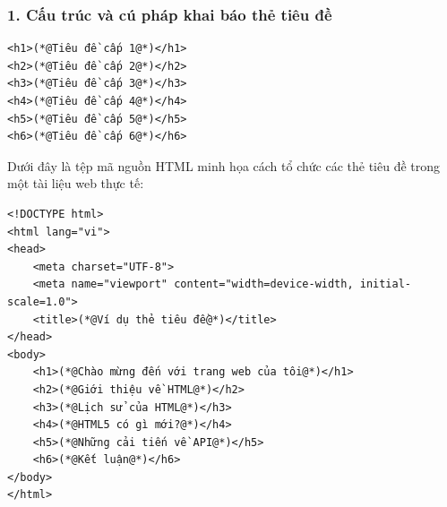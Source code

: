 \subsubsection{1. Cấu trúc và cú pháp khai báo thẻ tiêu đề}

\begin{codeWindow}
\begin{lstlisting}[language=HTML5]
<h1>(*@Tiêu đề cấp 1@*)</h1>
<h2>(*@Tiêu đề cấp 2@*)</h2>
<h3>(*@Tiêu đề cấp 3@*)</h3>
<h4>(*@Tiêu đề cấp 4@*)</h4>
<h5>(*@Tiêu đề cấp 5@*)</h5>
<h6>(*@Tiêu đề cấp 6@*)</h6>
\end{lstlisting}
\end{codeWindow}

Dưới đây là tệp mã nguồn HTML minh họa cách tổ chức các thẻ tiêu đề trong một tài liệu web thực tế:

\begin{codeWindow}
\begin{lstlisting}[language=HTML5]
<!DOCTYPE html>
<html lang="vi">
<head>
    <meta charset="UTF-8">
    <meta name="viewport" content="width=device-width, initial-scale=1.0">
    <title>(*@Ví dụ thẻ tiêu đề@*)</title>
</head>
<body>
    <h1>(*@Chào mừng đến với trang web của tôi@*)</h1>
    <h2>(*@Giới thiệu về HTML@*)</h2>
    <h3>(*@Lịch sử của HTML@*)</h3>
    <h4>(*@HTML5 có gì mới?@*)</h4>
    <h5>(*@Những cải tiến về API@*)</h5>
    <h6>(*@Kết luận@*)</h6>
</body>
</html>
\end{lstlisting}
\end{codeWindow}

